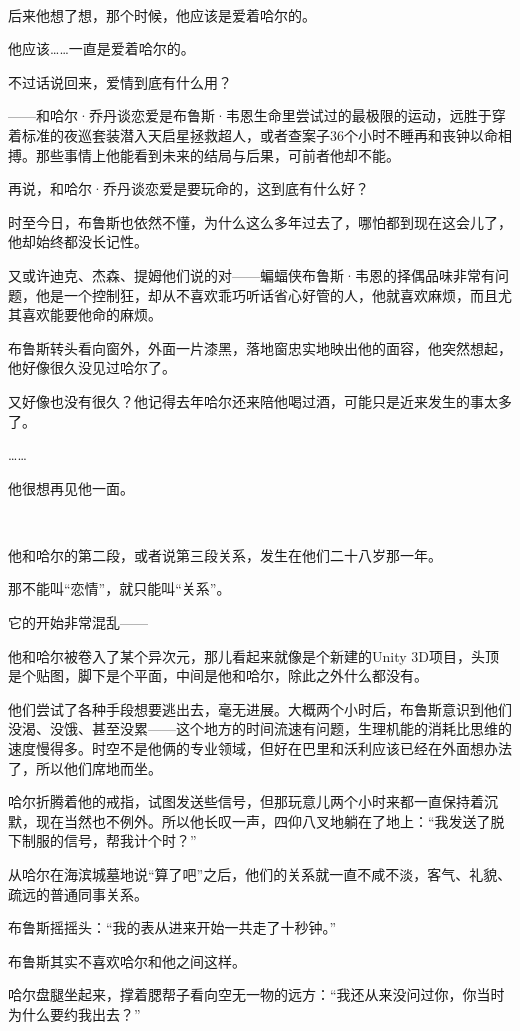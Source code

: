 \documentclass[../main]{subfiles}
\begin{document}
~\

后来他想了想，那个时候，他应该是爱着哈尔的。

他应该……一直是爱着哈尔的。

不过话说回来，爱情到底有什么用？

——和哈尔·乔丹谈恋爱是布鲁斯·韦恩生命里尝试过的最极限的运动，远胜于穿着标准的夜巡套装潜入天启星拯救超人，或者查案子36个小时不睡再和丧钟以命相搏。那些事情上他能看到未来的结局与后果，可前者他却不能。

再说，和哈尔·乔丹谈恋爱是要玩命的，这到底有什么好？

时至今日，布鲁斯也依然不懂，为什么这么多年过去了，哪怕都到现在这会儿了，他却始终都没长记性。

又或许迪克、杰森、提姆他们说的对——蝙蝠侠布鲁斯·韦恩的择偶品味非常有问题，他是一个控制狂，却从不喜欢乖巧听话省心好管的人，他就喜欢麻烦，而且尤其喜欢能要他命的麻烦。

布鲁斯转头看向窗外，外面一片漆黑，落地窗忠实地映出他的面容，他突然想起，他好像很久没见过哈尔了。

又好像也没有很久？他记得去年哈尔还来陪他喝过酒，可能只是近来发生的事太多了。

……

他很想再见他一面。

~\

他和哈尔的第二段，或者说第三段关系，发生在他们二十八岁那一年。

那不能叫“恋情”，就只能叫“关系”。

它的开始非常混乱——

他和哈尔被卷入了某个异次元，那儿看起来就像是个新建的Unity
3D项目，头顶是个贴图，脚下是个平面，中间是他和哈尔，除此之外什么都没有。

他们尝试了各种手段想要逃出去，毫无进展。大概两个小时后，布鲁斯意识到他们没渴、没饿、甚至没累——这个地方的时间流速有问题，生理机能的消耗比思维的速度慢得多。时空不是他俩的专业领域，但好在巴里和沃利应该已经在外面想办法了，所以他们席地而坐。

哈尔折腾着他的戒指，试图发送些信号，但那玩意儿两个小时来都一直保持着沉默，现在当然也不例外。所以他长叹一声，四仰八叉地躺在了地上：“我发送了脱下制服的信号，帮我计个时？”

从哈尔在海滨城墓地说“算了吧”之后，他们的关系就一直不咸不淡，客气、礼貌、疏远的普通同事关系。

布鲁斯摇摇头：“我的表从进来开始一共走了十秒钟。”

布鲁斯其实不喜欢哈尔和他之间这样。

哈尔盘腿坐起来，撑着腮帮子看向空无一物的远方：“我还从来没问过你，你当时为什么要约我出去？”
\end{document}
